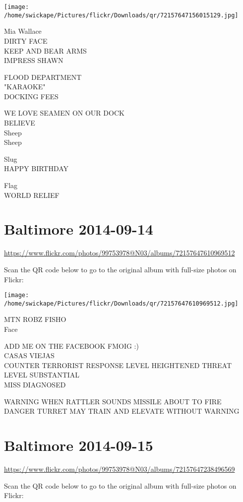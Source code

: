 \documentclass[10pt,letterpaper]{article}
\begin{document}
\texttt{[image: /home/swickape/Pictures/flickr/Downloads/qr/72157647156015129.jpg]}
\pagebreak

Mia Wallace\\
DIRTY FACE\\
KEEP AND BEAR ARMS\\
IMPRESS SHAWN

FLOOD DEPARTMENT\\
"KARAOKE"\\
DOCKING FEES

WE LOVE SEAMEN ON OUR DOCK\\
BELIEVE\\
Sheep\\
Sheep

Slug\\
HAPPY BIRTHDAY

Flag\\
WORLD RELIEF
\pagebreak

\section*{Baltimore 2014-09-14}

\url{https://www.flickr.com/photos/99753978@N03/albums/72157647610969512}

Scan the QR code below to go to the original album with full-size photos on Flickr:

\texttt{[image: /home/swickape/Pictures/flickr/Downloads/qr/72157647610969512.jpg]}
\pagebreak

MTN ROBZ FISHO\\
Face

ADD ME ON THE FACEBOOK FMOIG :)\\
CASAS VIEJAS\\
COUNTER TERRORIST RESPONSE LEVEL HEIGHTENED THREAT LEVEL SUBSTANTIAL\\
MISS DIAGNOSED

WARNING WHEN RATTLER SOUNDS MISSILE ABOUT TO FIRE\\
DANGER TURRET MAY TRAIN AND ELEVATE WITHOUT WARNING
\pagebreak

\section*{Baltimore 2014-09-15}

\url{https://www.flickr.com/photos/99753978@N03/albums/72157647238496569}

Scan the QR code below to go to the original album with full-size photos on Flickr:
\end{document}
